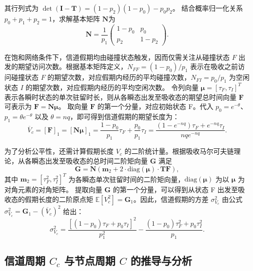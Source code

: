 其行列式为 $\det(\mathbf{I} - \mathbf{T}) = (1-p_2)(1-p_0) - p_0 p_2 $。
结合概率归一化关系 $p_0 + p_1 + p_2 = 1$，求解基本矩阵 $\mathbf{N}$为
\begin{equation}
	\mathbf{N} = \frac{1}{p_1} \begin{pmatrix} 1-p_0 & p_0 \\ p_2 & 1-p_2 \end{pmatrix}.
\end{equation}

在饱和网络条件下，信道假期均由碰撞状态触发，因而仅需关注从碰撞状态 $F$ 出发的期望访问次数。根据基本矩阵定义，$N_{FF} = (1-p_0)/p_1$ 表示在吸收之前访问碰撞状态 $F$ 的期望次数，对应假期内经历的平均碰撞次数，$N_{FI} = p_0/p_1$ 为空闲状态 $I$ 的期望次数，对应假期内经历的平均空闲次数。
令列向量 $\boldsymbol{\mu} = [\tau_F, \tau_I]^T$ 表示各瞬时状态的单次驻留时长，则从各瞬态出发至吸收态的期望总时间向量 $\mathbf{F}$ 可表示为 $\mathbf{F} = \mathbf{N} \boldsymbol{\mu}$。
取向量 $\mathbf{F}$ 的第一个分量，对应初始状态 F。代入 $p_0 = e^{-\theta}$、$p_1 = \theta e^{-\theta}$ 以及 $\theta = nq$，即可得到信道假期的期望长度为：
\begin{equation}
	\overline{V}_c = [\mathbf{F}]_1 = [\mathbf{N} \boldsymbol{\mu}]_1 = \frac{1-p_0}{p_1}\tau_F + \frac{p_0}{p_1}\tau_I = \frac{(1 - e^{-nq})\tau_F + e^{-nq}\tau_I}{nq e^{-nq}}.
\end{equation}

为了分析公平性，还需计算假期长度 $V_c$ 的二阶统计量。根据吸收马尔可夫链理论，从各瞬态出发至吸收态的总时间二阶矩向量 $\mathbf{G}$ 满足
\begin{equation}
	\mathbf{G} = \mathbf{N} ( \mathbf{m}_2 + 2 \cdot \text{diag}(\boldsymbol{\mu}) \cdot \mathbf{T} \mathbf{F} ),
\end{equation}
其中 $\mathbf{m}_2 = [\tau_F^2, \tau_I^2]^T$ 为各瞬态单次驻留时间的二阶矩向量，$\text{diag}(\boldsymbol{\mu})$ 为以 $\boldsymbol{\mu}$ 为对角元素的对角矩阵。
提取向量 $\mathbf{G}$ 的第一个分量，可以得到从状态 F 出发至吸收态的假期长度的二阶原点矩 $\mathbb{E}[V_c^2] = \mathbf{G}_1$。因此，信道假期的方差 $\sigma^2_{V_c}$ 由公式 $\sigma^2_{V_c} = \mathbf{G}_1 - (\overline{V}_c)^2$ 给出：
\begin{equation}
	\sigma^2_{V_c} =
	\frac{\left[(1 - p_0)\tau_F + p_0\tau_I\right]^2}{p_1^2} - \frac{(1 - p_0)\tau_F^2 + p_0\tau_I^2}{p_1}.
\end{equation}


\subsection{信道周期 $C_c$ 与节点周期 $C$ 的推导与分析}
\label{subsec:cycle_analysis}

